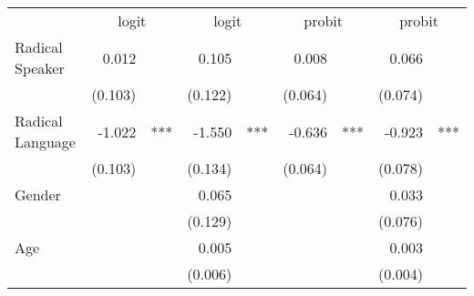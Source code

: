 \documentclass{article}
\begin{document}
\begin{table}[!h]
\centering
\begin{tabular}{lllllllll}
\cline{1-9}
\multicolumn{1}{r}{} &
  \multicolumn{2}{c}{logit} &
  \multicolumn{2}{c}{logit} &
  \multicolumn{2}{c}{probit} &
  \multicolumn{2}{c}{probit} \\
\cline{1-9}
\multicolumn{1}{l}{Radical Speaker} &
  \multicolumn{1}{r}{0.012} &
  \multicolumn{1}{l}{} &
  \multicolumn{1}{r}{0.105} &
  \multicolumn{1}{l}{} &
  \multicolumn{1}{r}{0.008} &
  \multicolumn{1}{l}{} &
  \multicolumn{1}{r}{0.066} &
  \multicolumn{1}{l}{} \\
\multicolumn{1}{l}{} &
  \multicolumn{1}{r}{(0.103)} &
  \multicolumn{1}{l}{} &
  \multicolumn{1}{r}{(0.122)} &
  \multicolumn{1}{l}{} &
  \multicolumn{1}{r}{(0.064)} &
  \multicolumn{1}{l}{} &
  \multicolumn{1}{r}{(0.074)} &
  \multicolumn{1}{l}{} \\
\multicolumn{1}{l}{Radical Language} &
  \multicolumn{1}{r}{-1.022} &
  \multicolumn{1}{l}{***} &
  \multicolumn{1}{r}{-1.550} &
  \multicolumn{1}{l}{***} &
  \multicolumn{1}{r}{-0.636} &
  \multicolumn{1}{l}{***} &
  \multicolumn{1}{r}{-0.923} &
  \multicolumn{1}{l}{***} \\
\multicolumn{1}{l}{} &
  \multicolumn{1}{r}{(0.103)} &
  \multicolumn{1}{l}{} &
  \multicolumn{1}{r}{(0.134)} &
  \multicolumn{1}{l}{} &
  \multicolumn{1}{r}{(0.064)} &
  \multicolumn{1}{l}{} &
  \multicolumn{1}{r}{(0.078)} &
  \multicolumn{1}{l}{} \\
\multicolumn{1}{l}{Gender} &
  \multicolumn{1}{r}{} &
  \multicolumn{1}{l}{} &
  \multicolumn{1}{r}{0.065} &
  \multicolumn{1}{l}{} &
  \multicolumn{1}{r}{} &
  \multicolumn{1}{l}{} &
  \multicolumn{1}{r}{0.033} &
  \multicolumn{1}{l}{} \\
\multicolumn{1}{l}{} &
  \multicolumn{1}{r}{} &
  \multicolumn{1}{l}{} &
  \multicolumn{1}{r}{(0.129)} &
  \multicolumn{1}{l}{} &
  \multicolumn{1}{r}{} &
  \multicolumn{1}{l}{} &
  \multicolumn{1}{r}{(0.076)} &
  \multicolumn{1}{l}{} \\
\multicolumn{1}{l}{Age} &
  \multicolumn{1}{r}{} &
  \multicolumn{1}{l}{} &
  \multicolumn{1}{r}{0.005} &
  \multicolumn{1}{l}{} &
  \multicolumn{1}{r}{} &
  \multicolumn{1}{l}{} &
  \multicolumn{1}{r}{0.003} &
  \multicolumn{1}{l}{} \\
\multicolumn{1}{l}{} &
  \multicolumn{1}{r}{} &
  \multicolumn{1}{l}{} &
  \multicolumn{1}{r}{(0.006)} &
  \multicolumn{1}{l}{} &
  \multicolumn{1}{r}{} &
  \multicolumn{1}{l}{} &
  \multicolumn{1}{r}{(0.004)} &
  \multicolumn{1}{l}{} \\

\end{tabular}
\end{table}
\end{document}
